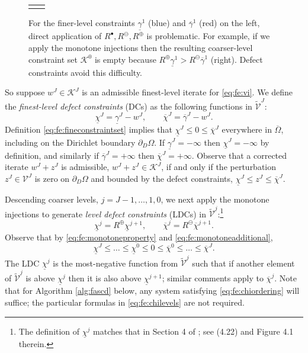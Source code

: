 \documentclass[review,hidelinks,onefignum,onetabnum]{siamart220329}
\newcommand{\cK}{\mathcal{K}}
\newcommand{\maxR}{R^{\bm{\oplus}}}
\newcommand{\minR}{R^{\bm{\ominus}}}
\newcommand{\iR}{R^{\bullet}}
\begin{document}
\begin{figure}[ht]
\centering
\begin{tabular}{cc}

&

\end{tabular}
\caption{For the finer-level constraints $\underline{\gamma}^1$ (blue) and $\overline{\gamma}^1$ (red) on the left, direct application of $\iR,\minR,\maxR$ is problematic.  For example, if we apply the monotone injections then the resulting coarser-level constraint set $\mathcal{K}^0$ is empty because $\maxR \underline{\gamma}^1 > \minR \overline{\gamma}^1$ (right).  Defect constraints avoid this difficulty.}
\label{fig:directRbad}
\end{figure}

So suppose $w^J \in \cK^J$ is an admissible finest-level iterate for \eqref{eq:fe:vi}.  We define the \emph{finest-level defect constraints} (DCs) \cite{GraeserKornhuber2009} as the following functions in $\tilde{\mathcal{V}}^J$:
\begin{equation}
\underline{\chi}^J = \underline{\gamma}^J - w^J, \qquad \overline{\chi}^J = \overline{\gamma}^J - w^J. \label{eq:fe:defectconstraints}
\end{equation}
Definition \eqref{eq:fe:fineconstraintset} implies that $\underline{\chi}^J \le 0 \le \overline{\chi}^J$ everywhere in $\overline{\Omega}$, including on the Dirichlet boundary $\partial_D\Omega$.  If $\underline{\gamma}^J=-\infty$ then $\underline{\chi}^J=-\infty$ by definition, and similarly if $\overline{\gamma}^J=+\infty$ then $\overline{\chi}^J=+\infty$.  Observe that a corrected iterate $w^J + z^J$ is admissible, $w^J + z^J \in \cK^J$, if and only if the perturbation $z^J \in \mathcal{V}^J$ is zero on $\partial_D\Omega$ and bounded by the defect constraints, $\underline{\chi}^J \le z^J \le \overline{\chi}^J$.

Descending coarser levels, $j=J-1,\dots,1,0$, we next apply the monotone injections to generate \emph{level defect constraints} (LDCs) in $\tilde{\mathcal{V}}^j$:\footnote{The definition of $\underline{\chi}^j$ matches that in Section 4 of \cite{GraeserKornhuber2009}; see (4.22) and Figure 4.1 therein.}
\begin{equation}
\underline{\chi}^{j} = \maxR \underline{\chi}^{j+1}, \qquad \overline{\chi}^{j} = \minR \overline{\chi}^{j+1}. \label{eq:fe:chilevels}
\end{equation}
Observe that by \eqref{eq:fe:monotoneproperty} and \eqref{eq:fe:monotoneadditional},
\begin{equation}
\underline{\chi}^{J} \le \dots \le \underline{\chi}^0 \le 0 \le \overline{\chi}^0 \le \dots \le \overline{\chi}^J. \label{eq:fe:chiordering}
\end{equation}
The LDC $\underline{\chi}^j$ is the most-negative function from $\tilde{\mathcal{V}}^j$ such that if another element of $\tilde{\mathcal{V}}^j$ is above $\underline{\chi}^j$ then it is also above $\underline{\chi}^{j+1}$; similar comments apply to $\overline{\chi}^{j}$.  Note that for Algorithm \ref{alg:fascd} below, any system satisfying \eqref{eq:fe:chiordering} will suffice; the particular formulas in \eqref{eq:fe:chilevels} are not required.
\end{document}
